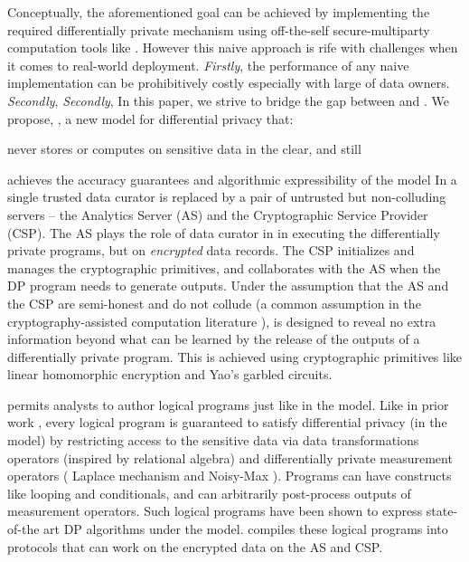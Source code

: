 Conceptually, the aforementioned goal can be achieved by implementing the required differentially private mechanism using off-the-self secure-multiparty computation tools like \cite{EMP,MPCtools,ScaleMAMBA,ABP}. However this naive approach is rife with challenges when it comes to real-world deployment. \textit{Firstly}, the performance of any naive implementation can be prohibitively costly especially with large of data owners. \textit{Secondly}, 
\textit{Secondly}, 
In this paper, we strive to bridge the gap between \ldp and \cdp. We propose, \system, a new model for differential privacy that: 
\squishlist
\item never stores or computes on sensitive data in the clear, and still
\item achieves the accuracy guarantees and algorithmic expressibility of the \cdp model \squishend 
In \system a single trusted data curator is replaced by a pair of untrusted but non-colluding servers -- the Analytics Server (\textsf{AS}) and the Cryptographic Service Provider (\textsf{CSP}). The \textsf{AS} plays the role of  data curator in \cdp in executing the differentially private programs, but on \textit{encrypted} data records. The \textsf{CSP} initializes and manages the cryptographic primitives, and collaborates with the \textsf{AS} when the DP program needs to generate outputs. Under the assumption that the \textsf{AS} and the \textsf{CSP} are semi-honest and do not collude (a common assumption in the cryptography-assisted computation literature \cite{Boneh1,Boneh2,Ridge2,Matrix2,secureML,LReg,Ver}), \system is designed to reveal no extra information beyond what can be learned by the release of the outputs of a differentially private program. This is achieved using cryptographic primitives like linear homomorphic encryption and Yao's garbled circuits. 

\system permits analysts to author logical programs just like in the \cdp model. Like in prior work \cite{PINQ, FWPINQ, ektelo}, every logical program is guaranteed to satisfy differential privacy (in the \cdp model) by restricting access to the sensitive data via data transformations operators (inspired by relational algebra) and differentially private measurement operators ( Laplace mechanism and Noisy-Max \cite{Dork}). Programs can have constructs like looping and conditionals, and can arbitrarily post-process outputs of measurement operators. Such logical programs have been shown to express state-of-the art DP algorithms under the \cdp model. \system compiles these logical programs into \system protocols that can work on the encrypted data on the \textsf{AS} and \textsf{CSP}. 


